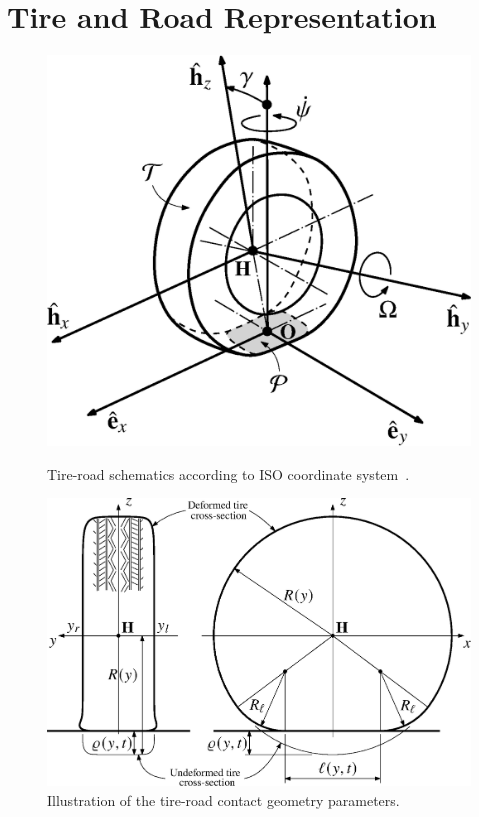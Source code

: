 
\section{Tire and Road Representation}
\label{app3:sec:tire_road_representation}

\begin{figure}[htb]
  \centering
  \begin{minipage}[t]{0.425\linewidth}
    \centering
    \includegraphics[width=0.9\linewidth]{./figures/appendix_3/tire_iso}
    \caption{Tire-road schematics according to ISO coordinate system~\cite{iso88552011}.}
    \label{app3:fig:tire_iso}
  \end{minipage}
  \hfill
  \begin{minipage}[t]{0.525\linewidth}
    \centering
    \includegraphics[width=1.0\linewidth]{./figures/appendix_3/belt_section}
    \caption{Illustration of the tire-road contact geometry parameters.}
    \label{app3:fig:belt_section}
  \end{minipage}
\end{figure}

